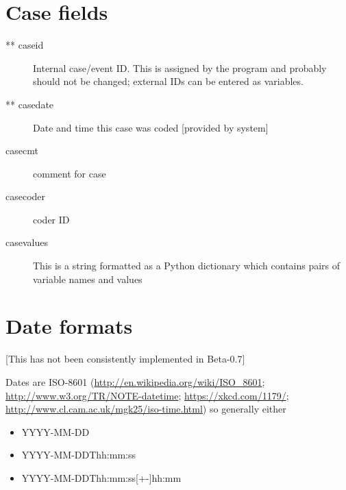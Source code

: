 \documentclass[letterpaper,10pt,english]{sphinxmanual}
\begin{document}
\section{Case fields}
\label{appendix2:case-fields}\begin{description}
\item[{** caseid}] \leavevmode
Internal case/event ID. This is assigned by the program and
probably should not be changed; external IDs can be entered as
variables.

\item[{** casedate}] \leavevmode
Date and time this case was coded {[}provided by system{]}

\item[{casecmt}] \leavevmode
comment for case

\item[{casecoder}] \leavevmode
coder ID

\item[{casevalues}] \leavevmode
This is a string formatted as a Python dictionary which contains
pairs of variable names and values

\end{description}


\section{Date formats}
\label{appendix2:date-formats}
{[}This has not been consistently implemented in Beta-0.7{]}

Dates are ISO-8601 (\href{http://en.wikipedia.org/wiki/ISO\_8601}{http://en.wikipedia.org/wiki/ISO\_8601};
\href{http://www.w3.org/TR/NOTE-datetime}{http://www.w3.org/TR/NOTE-datetime}; \href{https://xkcd.com/1179/}{https://xkcd.com/1179/};
\href{http://www.cl.cam.ac.uk/mgk25/iso-time.html}{http://www.cl.cam.ac.uk/mgk25/iso-time.html}) so generally either
\begin{itemize}
\item {} 
YYYY-MM-DD

\item {} 
YYYY-MM-DDThh:mm:ss

\item {} 
YYYY-MM-DDThh:mm:ss{[}+-{]}hh:mm

\end{itemize}
\end{document}
